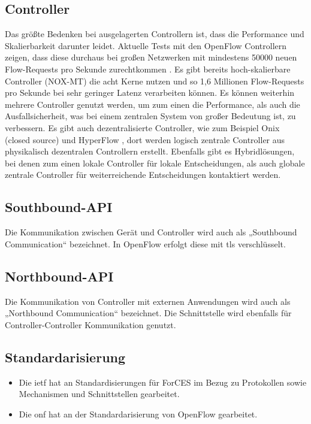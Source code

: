 \documentclass[twoside,12pt]{scrartcl}
\begin{document}
		\subsection{Controller}
Das größte Bedenken bei ausgelagerten Controllern ist, dass die Performance und Skalierbarkeit darunter leidet. Aktuelle Tests mit den OpenFlow Controllern zeigen, dass diese durchaus bei großen Netzwerken mit mindestens 50000 neuen Flow-Requests pro Sekunde zurechtkommen \cite{nox-mt}. Es gibt bereits hoch-skalierbare Controller (NOX-MT) die acht Kerne nutzen und so 1,6 Millionen Flow-Requests pro Sekunde bei sehr geringer Latenz verarbeiten können. Es können weiterhin mehrere Controller genutzt werden, um zum einen die Performance, als auch die Ausfallsicherheit, was bei einem zentralen System von großer Bedeutung ist, zu verbessern. Es gibt auch dezentralisierte Controller, wie zum Beispiel Onix (closed source) und HyperFlow \cite{hyperflow}, dort werden logisch zentrale Controller aus physikalisch dezentralen Controllern erstellt. Ebenfalls gibt es Hybridlösungen, bei denen zum einen lokale Controller für lokale Entscheidungen, als auch globale zentrale Controller für weiterreichende Entscheidungen kontaktiert werden.
		\subsection{Southbound-API}
Die Kommunikation zwischen Gerät und Controller wird auch als „Southbound Communication“ bezeichnet. In OpenFlow erfolgt diese mit \gls{tls} verschlüsselt.
		\subsection{Northbound-API}
Die Kommunikation von Controller mit externen Anwendungen  wird auch als „Northbound Communication“ bezeichnet. Die Schnittstelle wird ebenfalls für Controller-Controller Kommunikation genutzt.
		\subsection{Standardarisierung}
		\begin{itemize}
			\item Die \gls{ietf} hat an Standardisierungen für ForCES im Bezug zu Protokollen sowie Mechanismen und Schnittstellen gearbeitet.
			\item Die \gls{onf} hat an der Standardarisierung von OpenFlow gearbeitet.
		\end{itemize}
\end{document}
